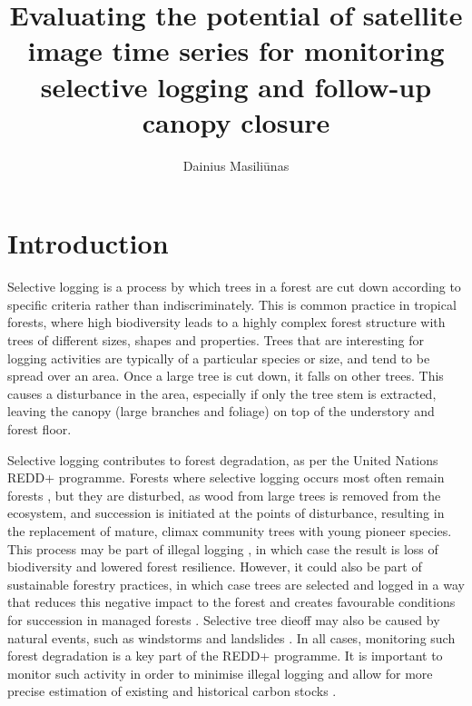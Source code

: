 \documentclass[a4paper,10pt]{article}
\title{Evaluating the potential of satellite image time series for monitoring selective logging and follow-up canopy closure}
\author{Dainius Masiliūnas}
\begin{document}
\maketitle

\section{Introduction}

Selective logging is a process by which trees in a forest are cut down according to specific criteria rather than indiscriminately. This is common practice in tropical forests, where high biodiversity leads to a highly complex forest structure with trees of different sizes, shapes and properties. Trees that are interesting for logging activities are typically of a particular species or size, and tend to be spread over an area. Once a large tree is cut down, it falls on other trees. This causes a disturbance in the area, especially if only the tree stem is extracted, leaving the canopy (large branches and foliage) on top of the understory and forest floor.

Selective logging contributes to forest degradation, as per the United Nations \ac{REDD+} programme. Forests where selective logging occurs most often remain forests \citep{asner_condition_2006}, but they are disturbed, as wood from large trees is removed from the ecosystem, and succession is initiated at the points of disturbance, resulting in the replacement of mature, climax community trees with young pioneer species. This process may be part of illegal logging \citep{rutishauser_rapid_2015}, in which case the result is loss of biodiversity and lowered forest resilience. However, it could also be part of sustainable forestry practices, in which case trees are selected and logged in a way that reduces this negative impact to the forest and creates favourable conditions for succession in managed forests \citep{west_forest_2014, keller_4._2004}. Selective tree dieoff may also be caused by natural events, such as windstorms and landslides \citep{frolking_forest_2009}. In all cases, monitoring such forest degradation is a key part of the \ac{REDD+} programme. It is important to monitor such activity in order to minimise illegal logging and allow for more precise estimation of existing and historical carbon stocks \citep{piponiot_carbon_2016, pinard_simulated_2000}.
\end{document}
